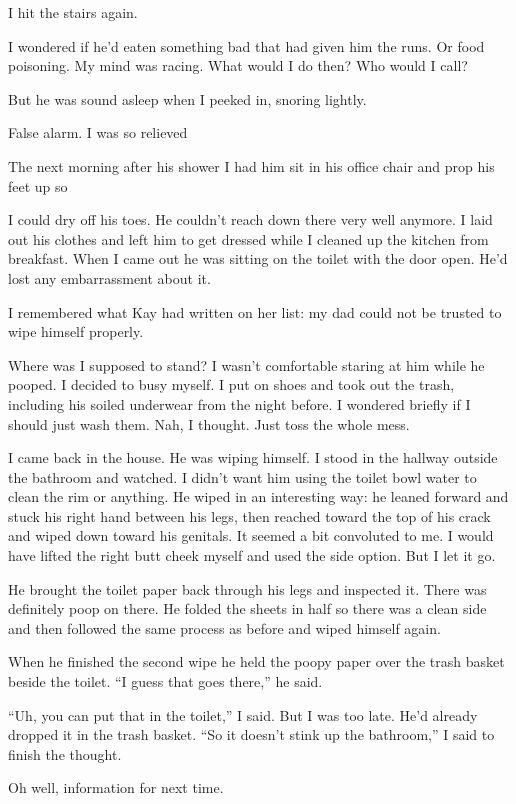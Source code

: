 \documentclass[12pt]{book}
\begin{document}
I hit the stairs again.

I wondered if he'd eaten something bad that had given him the runs. Or food poisoning. My mind was racing. What would I do then? Who would I call?

But he was sound asleep when I peeked in, snoring lightly.

False alarm. I was so relieved

The next morning after his shower I had him sit in his office chair and prop his feet up so

I could dry off his toes. He couldn't reach down there very well anymore. I laid out his clothes and left him to get dressed while I cleaned up the kitchen from breakfast. When I came out he was sitting on the toilet with the door open. He'd lost any embarrassment about it.

I remembered what Kay had written on her list: my dad could not be trusted to wipe himself properly.

Where was I supposed to stand? I wasn't comfortable staring at him while he pooped. I decided to busy myself. I put on shoes and took out the trash, including his soiled underwear from the night before. I wondered briefly if I should just wash them. Nah, I thought. Just toss the whole mess.

I came back in the house. He was wiping himself. I stood in the hallway outside the bathroom and watched. I didn't want him using the toilet bowl water to clean the rim or anything. He wiped in an interesting way: he leaned forward and stuck his right hand between his legs, then reached toward the top of his crack and wiped down toward his genitals. It seemed a bit convoluted to me. I would have lifted the right butt cheek myself and used the side option. But I let it go.

He brought the toilet paper back through his legs and inspected it. There was definitely poop on there. He folded the sheets in half so there was a clean side and then followed the same process as before and wiped himself again.

When he finished the second wipe he held the poopy paper over the trash basket beside the toilet. ``I guess that goes there,'' he said.

``Uh, you can put that in the toilet,'' I said. But I was too late. He'd already dropped it in the trash basket. ``So it doesn't stink up the bathroom,'' I said to finish the thought.

Oh well, information for next time.
\end{document}
